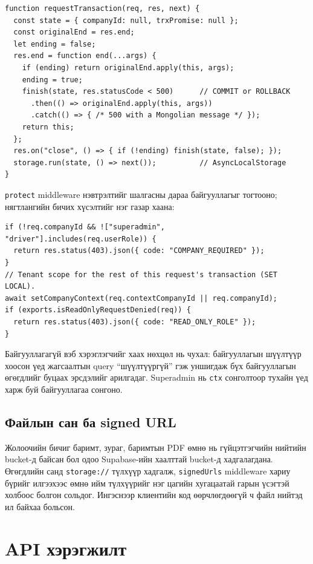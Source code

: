 \documentclass[
12pt,
oneside,
english,
onehalfspacing,
nolistspacing,
headsepline,
]{MUST-Thesis}
\begin{document}
\begin{verbatim}
function requestTransaction(req, res, next) {
  const state = { companyId: null, trxPromise: null };
  const originalEnd = res.end;
  let ending = false;
  res.end = function end(...args) {
    if (ending) return originalEnd.apply(this, args);
    ending = true;
    finish(state, res.statusCode < 500)      // COMMIT or ROLLBACK
      .then(() => originalEnd.apply(this, args))
      .catch(() => { /* 500 with a Mongolian message */ });
    return this;
  };
  res.on("close", () => { if (!ending) finish(state, false); });
  storage.run(state, () => next());          // AsyncLocalStorage
}
\end{verbatim}

\texttt{protect} middleware нэвтрэлтийг шалгасны дараа байгууллагыг тогтооно; нягтлангийн бичих хүсэлтийг нэг газар хаана:

\begin{verbatim}
if (!req.companyId && !["superadmin", "driver"].includes(req.userRole)) {
  return res.status(403).json({ code: "COMPANY_REQUIRED" });
}
// Tenant scope for the rest of this request's transaction (SET LOCAL).
await setCompanyContext(req.contextCompanyId || req.companyId);
if (exports.isReadOnlyRequestDenied(req)) {
  return res.status(403).json({ code: "READ_ONLY_ROLE" });
}
\end{verbatim}

Байгууллагагүй вэб хэрэглэгчийг хаах нөхцөл нь чухал: байгууллагын шүүлтүүр хоосон үед жагсаалтын query ``шүүлтүүргүй'' гэж уншигдаж бүх байгууллагын өгөгдлийг буцаах эрсдэлийг арилгадаг. Superadmin нь \texttt{ctx} сонголтоор тухайн үед харж буй байгууллагаа сонгоно.

\subsection{Файлын сан ба signed URL}

Жолоочийн бичиг баримт, зураг, баримтын PDF өмнө нь гүйцэтгэгчийн нийтийн bucket-д байсан бол одоо Supabase-ийн хаалттай bucket-д хадгалагдана. Өгөгдлийн санд \texttt{storage://} түлхүүр хадгалж, \texttt{signedUrls} middleware хариу бүрийг илгээхээс өмнө ийм түлхүүрийг нэг цагийн хугацаатай гарын үсэгтэй холбоос болгон сольдог. Ингэснээр клиентийн код өөрчлөгдөөгүй ч файл нийтэд ил байхаа больсон.

\section{API хэрэгжилт}
\end{document}
